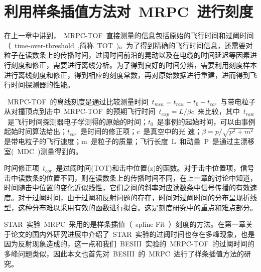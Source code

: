 \chapter{利用样条插值方法对~MRPC~进行刻度}

在上一章中讲到，~MRPC-TOF~直接测量的信息包括原始的飞行时间和过阈时间（~time-over-threshold~,简称~TOT~)。为了得到精确的飞行时间信息，还需要对粒子在读数条上的传播时间，过阈时间前沿的晃动以及在电缆的时间延迟等因素进行刻度和修正，需要进行离线分析。为了得到良好的时间分辨，需要利用刻度样本进行离线刻度和修正，得到相应的刻度常数，再对原始数据进行重建，进而得到飞行时间探测器的性能。

~MRPC-TOF~的离线刻度是通过比较测量时间~$t_{mea}=t_{raw}-t_{0}-t_{cor}$~与带电粒子从对撞顶点到击中~MRPC-TOF~的预期飞行时间~$t_{exp}=L/\beta c$~来比较，其中~$t_{raw}$~是飞行时间探测器电子学测得的原始的时间；$t_{0}$~是事例的起始时间，可以由事例起始时间算法给出；$t_{cor}$~是时间的修正项；c~是真空中的光
速；$\beta=p/\sqrt{p^2+m^2}$是带电粒子的飞行速度；m~是粒子的质量；飞行长度~L~和动量~P~是通过主漂移室(~MDC~)测量得到的。

时间修正项~$t_{cor}$~是过阈时间(TOT)和击中位置(z)的函数。对于击中位置项，信号击中读数条的位置不同，则在读数条上的传播时间不同，在上一章的讨论中知道，时间随击中位置的变化近似线性，它们之间的斜率对应读数条中信号传播的有效速度。对于过阈时间，由于过阈和反射问题的存在，时间对过阈时间的分布呈现折线型，这种分布难以采用有效的函数进行拟合。这是刻度研究中的重点和难点部分。

\begin{comment}
对于每一个读数条，每个读出单元定义：
\begin{displaymath}
\chi^2(counter,readout)=\sum\limits_{event}(t_{mea}-t_{exp})^2
\end{displaymath}
通过分析大量的事例样本，进行反复迭代，利用最小~$\chi^2$~方法，刻度常数项可以通过~$\partial\chi^2/\partial P_{i}=0$~得到。在重建中，利用刻度得到的刻度常数对原始的飞行时间信息进行重建，就可以得到经过刻度修正得到的飞行时间信息。
\end{comment}

STAR~实验~MRPC~采用的是样条插值（~spline Fit~）刻度的方法。在第一章关于论文的国内外研究进展中介绍了~STAR~实验的过阈时间也存在多峰现象，也是因为反射现象造成的，这一点和我们~BESIII~实验的~MRPC-TOF~的过阈时间的多峰问题类似，因此本文也首先对~BESIII~的~MRPC~进行了样条插值方法的研究。


